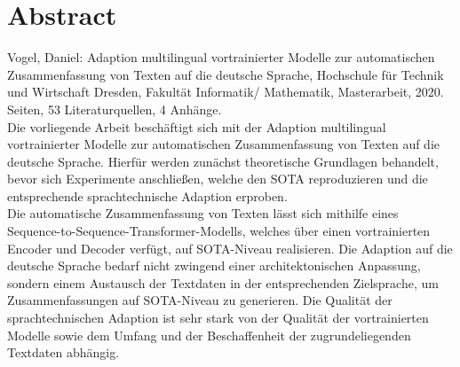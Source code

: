 \chapter*{Abstract}
\thispagestyle{empty}

\noindent
Vogel, Daniel: Adaption multilingual vortrainierter Modelle zur automatischen Zusammenfassung von Texten auf die deutsche Sprache, Hochschule für Technik und Wirtschaft Dresden, Fakultät Informatik/ Mathematik, Masterarbeit, 2020.\\[1ex]

 Seiten, 53 Literaturquellen, 4 Anhänge.\\[40ex]

\noindent
Die vorliegende Arbeit beschäftigt sich mit der Adaption multilingual vortrainierter Modelle zur automatischen Zusammenfassung von Texten auf die deutsche Sprache. Hierfür werden zunächst theoretische Grundlagen behandelt, bevor sich Experimente anschließen, welche den SOTA reproduzieren und die entsprechende sprachtechnische Adaption erproben.\\

\noindent
Die automatische Zusammenfassung von Texten lässt sich mithilfe eines Sequence-to-Sequence-Transformer-Modells, welches über einen vortrainierten Encoder und Decoder verfügt, auf SOTA-Niveau realisieren. Die Adaption auf die deutsche Sprache bedarf nicht zwingend einer architektonischen Anpassung, sondern einem Austausch der Textdaten in der entsprechenden Zielsprache, um Zusammenfassungen auf SOTA-Niveau zu generieren. Die Qualität der sprachtechnischen Adaption ist sehr stark von der Qualität der vortrainierten Modelle sowie dem Umfang und der Beschaffenheit der zugrundeliegenden Textdaten abhängig.
